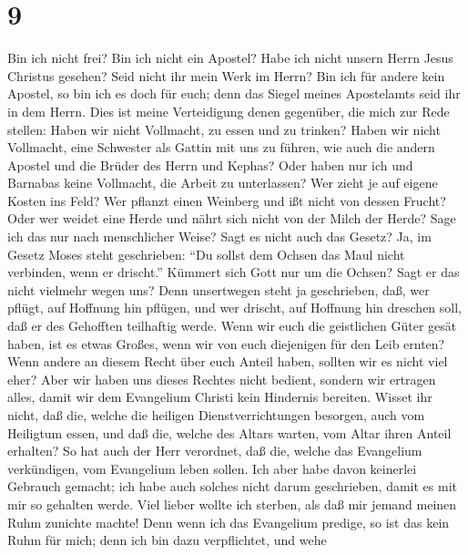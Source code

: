 \hypertarget{section-8}{%
\section{9}\label{section-8}}

 Bin ich nicht frei? Bin ich nicht ein Apostel? Habe ich
nicht unsern Herrn Jesus Christus gesehen? Seid nicht ihr mein Werk im
Herrn?  Bin ich für andere kein Apostel, so bin ich es
doch für euch; denn das Siegel meines Apostelamts seid ihr in dem Herrn.
 Dies ist meine Verteidigung denen gegenüber, die mich zur
Rede stellen:  Haben wir nicht Vollmacht, zu essen und zu
trinken?  Haben wir nicht Vollmacht, eine Schwester als
Gattin mit uns zu führen, wie auch die andern Apostel und die Brüder des
Herrn und Kephas?  Oder haben nur ich und Barnabas keine
Vollmacht, die Arbeit zu unterlassen?  Wer zieht je auf
eigene Kosten ins Feld? Wer pflanzt einen Weinberg und ißt nicht von
dessen Frucht? Oder wer weidet eine Herde und nährt sich nicht von der
Milch der Herde?  Sage ich das nur nach menschlicher
Weise? Sagt es nicht auch das Gesetz?  Ja, im Gesetz Moses
steht geschrieben: ``Du sollst dem Ochsen das Maul nicht verbinden, wenn
er drischt.''  Kümmert sich Gott nur um die Ochsen? Sagt
er das nicht vielmehr wegen uns? Denn unsertwegen steht ja geschrieben,
daß, wer pflügt, auf Hoffnung hin pflügen, und wer drischt, auf Hoffnung
hin dreschen soll, daß er des Gehofften teilhaftig werde.
 Wenn wir euch die geistlichen Güter gesät haben, ist es
etwas Großes, wenn wir von euch diejenigen für den Leib ernten?
 Wenn andere an diesem Recht über euch Anteil haben,
sollten wir es nicht viel eher? Aber wir haben uns dieses Rechtes nicht
bedient, sondern wir ertragen alles, damit wir dem Evangelium Christi
kein Hindernis bereiten.  Wisset ihr nicht, daß die,
welche die heiligen Dienstverrichtungen besorgen, auch vom Heiligtum
essen, und daß die, welche des Altars warten, vom Altar ihren Anteil
erhalten?  So hat auch der Herr verordnet, daß die,
welche das Evangelium verkündigen, vom Evangelium leben sollen.
 Ich aber habe davon keinerlei Gebrauch gemacht; ich habe
auch solches nicht darum geschrieben, damit es mit mir so gehalten
werde. Viel lieber wollte ich sterben, als daß mir jemand meinen Ruhm
zunichte machte!  Denn wenn ich das Evangelium predige,
so ist das kein Ruhm für mich; denn ich bin dazu verpflichtet, und wehe
